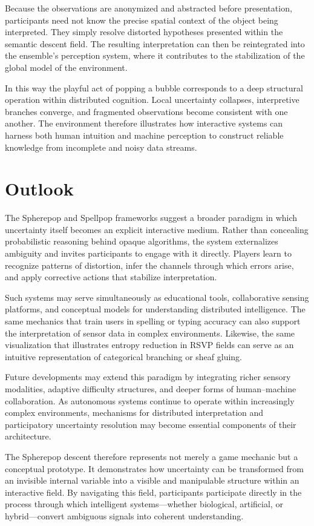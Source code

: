 \documentclass[11pt]{article}
\begin{document}
Because the observations are anonymized and abstracted before presentation, participants need not know the precise spatial context of the object being interpreted. They simply resolve distorted hypotheses presented within the semantic descent field. The resulting interpretation can then be reintegrated into the ensemble’s perception system, where it contributes to the stabilization of the global model of the environment.

In this way the playful act of popping a bubble corresponds to a deep structural operation within distributed cognition. Local uncertainty collapses, interpretive branches converge, and fragmented observations become consistent with one another. The environment therefore illustrates how interactive systems can harness both human intuition and machine perception to construct reliable knowledge from incomplete and noisy data streams.

\section{Outlook}

The Spherepop and Spellpop frameworks suggest a broader paradigm in which uncertainty itself becomes an explicit interactive medium. Rather than concealing probabilistic reasoning behind opaque algorithms, the system externalizes ambiguity and invites participants to engage with it directly. Players learn to recognize patterns of distortion, infer the channels through which errors arise, and apply corrective actions that stabilize interpretation.

Such systems may serve simultaneously as educational tools, collaborative sensing platforms, and conceptual models for understanding distributed intelligence. The same mechanics that train users in spelling or typing accuracy can also support the interpretation of sensor data in complex environments. Likewise, the same visualization that illustrates entropy reduction in RSVP fields can serve as an intuitive representation of categorical branching or sheaf gluing.

Future developments may extend this paradigm by integrating richer sensory modalities, adaptive difficulty structures, and deeper forms of human--machine collaboration. As autonomous systems continue to operate within increasingly complex environments, mechanisms for distributed interpretation and participatory uncertainty resolution may become essential components of their architecture.

The Spherepop descent therefore represents not merely a game mechanic but a conceptual prototype. It demonstrates how uncertainty can be transformed from an invisible internal variable into a visible and manipulable structure within an interactive field. By navigating this field, participants participate directly in the process through which intelligent systems—whether biological, artificial, or hybrid—convert ambiguous signals into coherent understanding.
\end{document}
